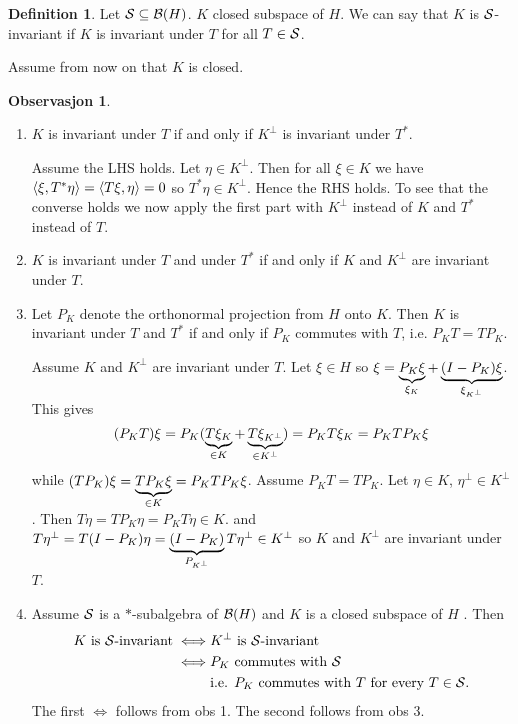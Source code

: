 \documentclass[10pt,english,a4paper]{article}
\theoremstyle{definition}
\newtheorem*{definition}{Definition}
\newtheorem*{observation}{Observasjon}
\begin{document}
\begin{definition}
    Let $\mathcal{S}\subseteq \mathcal{B}(H)$. $K$ closed subspace of $H$. We can say that 
$K$ is $\mathcal{S}$-invariant if $K$ is invariant under $T$ for all $T \in \mathcal{S}$.
\end{definition}

Assume from now on that $K$ is closed.
\begin{observation}
\leavevmode
\begin{enumerate}[(1)]
    \item 
$K$ is invariant under $T$ if and only if $K^{\perp}$ is invariant under $T^*$.
\medskip

Assume the LHS holds. Let $\eta\in K^{\perp}$. Then for all $\xi \in K$ we have 
$\left\langle \xi,T^*\eta \right\rangle=\left\langle T\xi,\eta \right\rangle = 0$ so $T^*\eta \in K^{\perp}$. Hence the 
RHS holds. To see that the converse holds we now apply the first part with 
$K^{\perp}$ instead of $K$ and $T^*$ instead of $T$.

\item $K$ is invariant under $T$ and under $T^*$ if and only if $K$ and
$K^{\perp}$ are invariant under $T$.

\item
Let $P_{K}$ denote the orthonormal projection from $H$ onto $K$. Then
$K$ is invariant under $T$ and $T^*$ if and only if $P_K$ commutes with $T$, i.e.
$P_KT=TP_K$.
\medskip

Assume $K$ and $K^{\perp}$ are invariant under $T$. Let $\xi \in H$ so 
$\xi = \underbrace{P_K\xi}_{\xi_{K}} + \underbrace{(I-P_{K})\xi}_{\xi_{K^{\perp}}}$. 
This gives 
\[
(P_KT)\xi = P_K (\underbrace{T\xi_{K}}_{\in K} + \underbrace{T\xi_{K^{\perp}}}_{\in K^{\perp}})
= P_KT\xi_{K}= P_KTP_K\xi
\]
while 
$(TP_K)\xi = \underbrace{TP_K \xi}_{\in K} = P_KTP_K\xi$. 
Assume $P_KT = TP_K$. Let $\eta \in K$, $\eta^{\perp}\in K^{\perp}$. 
Then $T\eta = TP_K \eta = P_KT\eta \in K$. and 
$T\eta^{\perp} = T(I-P_K)\eta = \underbrace{(I-P_K)}_{P_{K^\perp}} T\eta^{\perp} \in K^{\perp}$
so $K$ and $K^{\perp}$ are invariant under $T$.

\item
Assume $\mathcal{S}$ is a $*$-subalgebra of $\mathcal{B}(H)$ and $K$ is a closed subspace
of $H$ . Then 
\begin{align*}
K \text{ is } \mathcal{S}\text{-invariant} \iff& \text{$K^{\perp}$ is $\mathcal{S}$-invariant} \\
\iff& \text{$P_K$ commutes with $\mathcal{S}$} \\
  &\text{i.e. $P_K$ commutes with $T$ for every $T \in \mathcal{S}$.}
\end{align*}
The first $\iff$ follows from obs 1. The second follows from obs 3.

\end{enumerate}

\end{observation}
\end{document}

